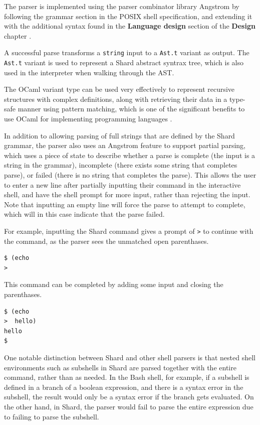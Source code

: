 \documentclass[twoside]{report}
\begin{document}
The parser is implemented using the parser combinator library Angstrom by following the grammar section in the POSIX shell specification, and extending it with the additional syntax found in the \textbf{Language design} section of the \textbf{Design} chapter \cite{ocamlangstrom} \cite{posix2017}.

A successful parse transforms a \texttt{string} input to a \texttt{Ast.t} variant as output. The \texttt{Ast.t} variant is used to represent a Shard abstract syntrax tree, which is also used in the interpreter when walking through the AST.

The OCaml variant type can be used very effectively to represent recursive structures with complex definitions, along with retrieving their data in a type-safe manner using pattern matching, which is one of the significant benefits to use OCaml for implementing programming languages \cite{realworldocaml}.

In addition to allowing parsing of full strings that are defined by the Shard grammar, the parser also uses an Angstrom feature to support partial parsing, which uses a piece of state to describe whether a parse is complete (the input is a string in the grammar), incomplete (there exists some string that completes parse), or failed (there is no string that completes the parse).
This allows the user to enter a new line after partially inputting their command in the interactive shell, and have the shell prompt for more input, rather than rejecting the input.
Note that inputting an empty line will force the parse to attempt to complete, which will in this case indicate that the parse failed.

For example, inputting the Shard command gives a prompt of \texttt{>} to continue with the command, as the parser sees the unmatched open parenthases.
\begin{lstlisting}[language=shard]
$ (echo
>
\end{lstlisting}

This command can be completed by adding some input and closing the parenthases.
\begin{lstlisting}[language=shard]
$ (echo
>  hello)
hello
$
\end{lstlisting}

One notable distinction between Shard and other shell parsers is that nested shell environments such as subshells in Shard are parsed together with the entire command, rather than as needed.
In the Bash shell, for example, if a subshell is defined in a branch of a boolean expression, and there is a syntax error in the subshell, the result would only be a syntax error if the branch gets evaluated.
On the other hand, in Shard, the parser would fail to parse the entire expression due to failing to parse the subshell.
\end{document}
